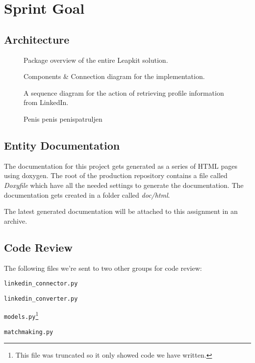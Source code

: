 \section{Sprint Goal}


\subsection{Architecture}
\begin{figure}[ht]
    \centering
    \scalebox{1}{}
    \caption{Package overview of the entire Leapkit solution.}
    \label{fig:overview}
\end{figure}

\begin{figure}[ht]
    \centering
    \scalebox{1}{}
    \caption{Components \& Connection diagram for the implementation.}
    \label{fig:packages}
\end{figure}

\begin{figure}[ht]
    \centering
    \scalebox{1}{}
    \caption{A sequence diagram for the action of retrieving profile information from LinkedIn.}
    \label{fig:sequence}
\end{figure}

\begin{figure}
    \centering
    \scalebox{.5}{}
    \caption{Penis penis penispatruljen}
    \label{fig:sequence2}
\end{figure}


\subsection{Entity Documentation}

The documentation for this project gets generated as a series of HTML pages
using doxygen. The root of the production repository contains a file called
\textit{Doxyfile} which have all the needed settings to generate the
documentation. The documentation gets created in a folder called
\textit{doc/html}.

The latest generated documentation will be attached to this assignment in an
archive.

\subsection{Code Review}
The following files we're sent to two other groups for code review:
\begin{itemize*}
    \item \texttt{linkedin\_connector.py}
    \item \texttt{linkedin\_converter.py}
    \item \texttt{models.py}\footnote{This file was truncated so it only showed code we have written.}
    \item \texttt{matchmaking.py}
\end{itemize*}

